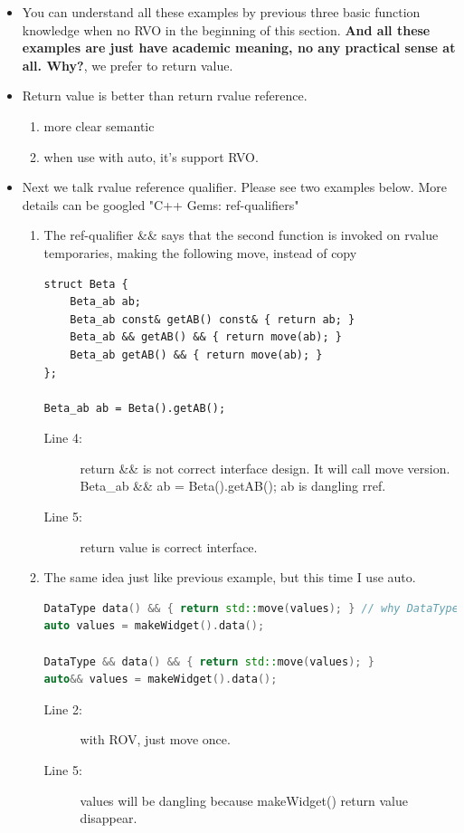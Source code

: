 \documentclass[a4paper,11pt,twoside]{book}
\begin{document}
\begin{itemize}
	
	\item You can understand all these examples by previous three basic function knowledge when no RVO in the beginning of this section. \textbf{And all these examples are just have academic meaning, no any practical sense at all. Why?}, we prefer to return value. 

	
	\item Return value is better than return rvalue reference.
	\begin{enumerate}
		\item more clear semantic 
		\item when use with auto, it's support RVO.
	\end{enumerate}
	
	\item Next we talk rvalue reference qualifier. Please see two examples below. More details can be googled  "C++ Gems: ref-qualifiers"
	\begin{enumerate}

		\item The ref-qualifier \&\& says that the second function is invoked on rvalue temporaries, making the following move, instead of copy
	
\begin{lstlisting}
struct Beta {
	Beta_ab ab;
	Beta_ab const& getAB() const& { return ab; }
	Beta_ab && getAB() && { return move(ab); }
	Beta_ab getAB() && { return move(ab); }
};

Beta_ab ab = Beta().getAB();
\end{lstlisting}
\begin{description}
	\item[Line 4:] return \&\& is not correct interface design. It will call move version. Beta\_ab \&\& ab = Beta().getAB(); ab is dangling rref.
	\item[Line 5:] return value is correct interface.
\end{description}

			\item The same idea just like previous example, but this time I use auto.
\begin{lstlisting}[frame=single, language=c++]
DataType data() && { return std::move(values); } // why DataType?
auto values = makeWidget().data();

DataType && data() && { return std::move(values); }
auto&& values = makeWidget().data();
\end{lstlisting}
\begin{description}
	\item[Line 2:] with ROV, just move once. 
	\item[Line 5:] values will be dangling because makeWidget() return value disappear.
\end{description}


\end{enumerate}
\end{itemize}
\end{document}
